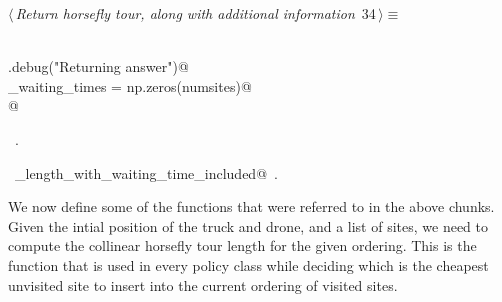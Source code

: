 \documentclass[11.5pt]{report}
\begin{document}
\begin{flushleft} \small\label{scrap28}\raggedright\small
{} $\langle\,${\itshape Return horsefly tour, along with additional information}\nobreak\ {\footnotesize {34}}$\,\rangle\equiv$
\vspace{-1ex}
\begin{list}{}{} \item
\mbox{}\verb@@\\
\mbox{}\verb@logger.debug("Returning answer")@\\
\mbox{}\verb@horse_waiting_times = np.zeros(numsites)@\\
\mbox{}@\\
\mbox{}\verb@@{\NWsep}
\end{list}
\vspace{-1.5ex}
\footnotesize
\begin{list}{}{\setlength{\itemsep}{-\parsep}\setlength{\itemindent}{-\leftmargin}}
\item \NWtxtMacroRefIn\ .
\item \NWtxtIdentsUsed\nobreak\  \verb@tour_length_with_waiting_time_included@\nobreak\ .
\item{}
\end{list}
\vspace{4ex}
\end{flushleft}

\newchunk We now define some of the functions that were referred to in the above chunks. 
Given the intial position of the truck and drone, and a list of sites, we need to compute 
the collinear horsefly tour length for the given ordering. This is the function that is 
used in every policy class while deciding which is the cheapest unvisited site to insert 
into the current ordering of visited sites. 
\end{document}
